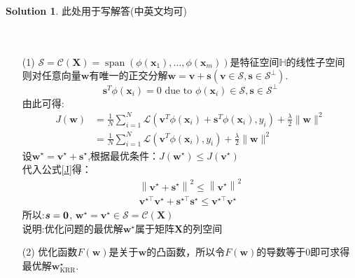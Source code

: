 \documentclass[a4paper,UTF8]{article}
\numberwithin{equation}{section}
\theoremstyle{definition}
\newtheorem*{solution}{Solution}
\def \X {\boldsymbol{X}}
\def \w {\boldsymbol{w}}
\def \v {\boldsymbol{v}}
\def \s {\boldsymbol{s}}
\begin{document}
\begin{solution}
	此处用于写解答(中英文均可)
	~\\
	~\\
	~\\
    \begin{enumerate}
        \item [(1)]
        $\mathcal{S} = \mathcal{C}(\X) = \operatorname{span}\left(\phi\left(\boldsymbol{x}_{1}\right), \ldots, \phi\left(\boldsymbol{x}_{m}\right)\right)$是特征空间$\mathbb{H}$的线性子空间\\
        则对任意向量$\w$有唯一的正交分解$\w = \v + \s(\v \in \mathcal{S}, \s \in \mathcal{S}^{\perp})$. \\
        \begin{equation}
            \boldsymbol{s}^{T} \phi\left(\boldsymbol{x}_{i}\right) = 0 \text{ due to }  \phi\left(\boldsymbol{x}_{i}\right) \in \mathcal{S}, \s \in \mathcal{S}^{\perp}
        \end{equation}
        由此可得:
        \begin{equation}
            \begin{aligned} J(\boldsymbol{w}) & =\frac{1}{N} \sum_{i=1}^{N} \mathcal{L}\left(\boldsymbol{v}^{T} \phi\left(\boldsymbol{x}_{i}\right)+\boldsymbol{s}^{T} \phi\left(\boldsymbol{x}_{i}\right), y_{i}\right)+\frac{\lambda}{2}\|\boldsymbol{w}\|^{2} \\ & =\frac{1}{N} \sum_{i=1}^{N} \mathcal{L}\left(\boldsymbol{v}^{T} \phi\left(\boldsymbol{x}_{i}\right), y_{i}\right)+\frac{\lambda}{2}\|\boldsymbol{w}\|^{2}\end{aligned} \label{J}
        \end{equation}
        设$\w^{\star}=\v^{\star}+\s^{\star}$,根据最优条件：$J(\w^{\star}) \leq J(\v^{\star})$ \\
        代入公式\ref*{J}得：
        \begin{equation}
            \begin{array}{c}\left\|\v^{\star}+\s^{\star}\right\|^{2} \leq\left\|\v^{\star}\right\|^{2} \\ \v^{\star \top} \v^{\star}+\s^{\star \top} \s^{\star} \leq \v^{\star \top} \v^{\star}\end{array}
        \end{equation}
        所以:$\s = \bold{0}$, $\w^{\star}=\v^{\star} \in \mathcal{S}= \mathcal{C}(\X)$\\
        说明:优化问题的最优解$\w^\star$属于矩阵$\X$的列空间
        \item [(2)]
        优化函数$F(\w)$是关于$\w$的凸函数，所以令$F(\w)$的导数等于0即可求得最优解$\w_{\text{KRR}}^\star$.\\

\end{enumerate}
\end{solution}
\end{document}
